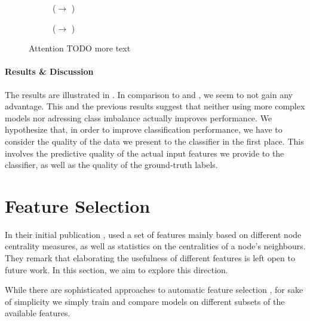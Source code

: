 \documentclass[
	fontsize=10pt, %
	twoside=false, %
	secnumdepth=1, %
  toc=indentunnumbered %
]{kaobook}
\begin{document}
\begin{figure}[h]
\centering
\begin{subfigure}[h]{0.48\linewidth}
  \caption{(\ADLast $\rightarrow$ \PDMap)}
\end{subfigure}
\begin{subfigure}[h]{0.48\linewidth}
  \caption{(\ADLast $\rightarrow$ \ReconMap{})}
\end{subfigure}
\caption{Attention TODO more text}
\label{fig:results-attention}
\end{figure}

\paragraph{Results \& Discussion} The results are illustrated in
. In comparison to 
and , we seem to not gain any advantage.
%
This and the previous results suggest that neither using more complex models nor
adressing class imbalance actually improves performance. We hypothesize that, in
order to improve classification performance, we have to consider the quality of
the data we present to the classifier in the first place. This involves the
predictive quality of the actual input features we provide to the classifier, as
well as the quality of the ground-truth labels.





\section{Feature Selection}
\label{sec:feature-selection}


In their initial publication \cite{nielsen_MachineLearningSupport_2019},
\nielsen{} used a set of features mainly based on different node centrality
measures, as well as statistics on the centralities of a node's neighbours. They
remark that elaborating the usefulness of different features is left open to
future work. In this section, we aim to explore this direction.

While there are sophisticated approaches to automatic feature selection  
\cite{saeys_ReviewFeatureSelection_2007},
for sake of simplicity we simply train and compare models on different subsets
of the available features.
\end{document}

